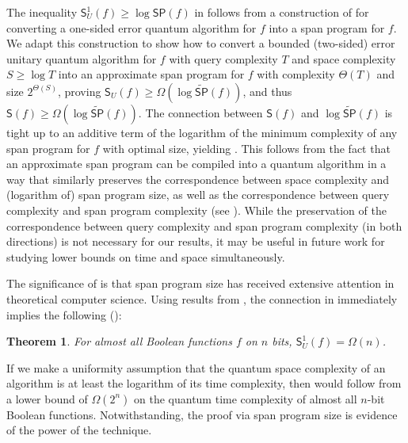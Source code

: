 \documentclass[11pt]{article}
\numberwithin{equation}{section}
\newtheorem{theorem}{Theorem}[section]
\theoremstyle{definition}
\theoremstyle{plain}
\begin{document}
The inequality $\mathsf{S}_U^1(f)\geq\log\mathsf{SP}(f)$ in  follows from a construction of \cite{Rei09} for converting a one-sided error quantum algorithm for $f$ into a span program for $f$. We adapt this construction to show how to convert a bounded (two-sided) error unitary quantum algorithm for $f$ with query complexity $T$ and space complexity $S\geq \log T$ into an approximate span program for $f$ with complexity $\Theta(T)$ and size $2^{\Theta(S)}$, proving $\mathsf{S}_U(f)\geq \Omega(\log\widetilde{\mathsf{SP}}(f))$, and thus $\mathsf{S}(f)\geq \Omega(\log\widetilde{\mathsf{SP}}(f))$. The connection between $\mathsf{S}(f)$ and $\log\widetilde{\mathsf{SP}}(f)$ is tight up to an additive term of the logarithm of the minimum complexity of any span program for $f$ with optimal size, yielding . This follows from the fact that an approximate span program can be compiled into a quantum algorithm in a way that similarly preserves the correspondence between space complexity and (logarithm of) span program size, as well as the correspondence between query complexity and span program complexity (see ). While the preservation of the correspondence between query complexity and span program complexity (in both directions) is not necessary for our results, it may be useful in future work for studying lower bounds on time and space simultaneously.



The significance of  is that span program size has received extensive attention in theoretical computer science. Using results from \cite{BGW99}, the connection in  immediately implies the following ():
\begin{theorem}\label{thm:almost-all-informal}
For almost all Boolean functions $f$ on $n$ bits, $\mathsf{S}_U^1(f)=\Omega({n})$. 
\end{theorem}
If we make a uniformity assumption that the quantum space complexity of an algorithm is at least the logarithm of its time complexity, then  would follow from a lower bound of $\Omega(2^n)$ on the quantum time complexity of almost all $n$-bit Boolean functions. Notwithstanding, the proof via span program size is evidence of the power of the technique. 
\end{document}
